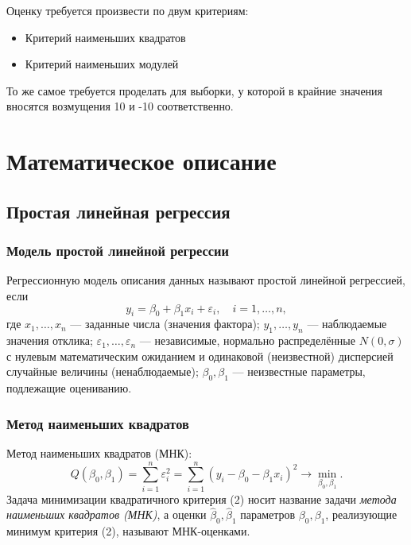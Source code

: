\documentclass[12pt]{article}
\begin{document}
Оценку требуется произвести по двум критериям:
\begin{itemize}
	\item Критерий наименьших квадратов
	\item Критерий наименьших модулей
\end{itemize}

То же самое требуется проделать для выборки, у которой в крайние значения вносятся возмущения 10 и -10 соответственно.

\newpage
	\section{Математическое описание}
	
	\subsection{Простая линейная регрессия}

    \subsubsection{Модель простой линейной регрессии}
    Регрессионную модель описания данных называют простой линейной регрессией, если
    \begin{equation}\label{y}
        y_i = \beta_0 + \beta_1x_i + \varepsilon_i, \quad i=1, \dots, n,
    \end{equation}
    где $x_1, \dots, x_n$ — заданные числа (значения фактора); $y_1, \dots, y_n$ — наблюдаемые значения отклика; $\varepsilon_1, \dots, \varepsilon_n$ — независимые, нормально распределённые $N(0,\sigma)$ с нулевым математическим ожиданием и одинаковой (неизвестной) дисперсией случайные величины (ненаблюдаемые); $\beta_0, \beta_1$ — неизвестные параметры, подлежащие оцениванию. \cite{lit1}



    \subsubsection{Метод наименьших квадратов}
    Метод наименьших квадратов (МНК):
    \begin{equation}\label{mnk}
        Q(\beta_0, \beta_1) = \sum_{i = 1}^{n}\varepsilon_{i}^{2} = \sum_{i = 1}^{n}(y_i - \beta_0 - \beta_1x_i)^2 \rightarrow \min_{\beta_0, \beta_1}.
    \end{equation}
Задача минимизации квадратичного критерия (2) носит название задачи {\it метода наименьших квадратов (МНК)},  а оценки  $\hat{\beta}_0, \hat{\beta}_1$ параметров $\beta_0, \beta_1$, реализующие минимум критерия (2), называют МНК-оценками. \cite{lit1}
\end{document}
